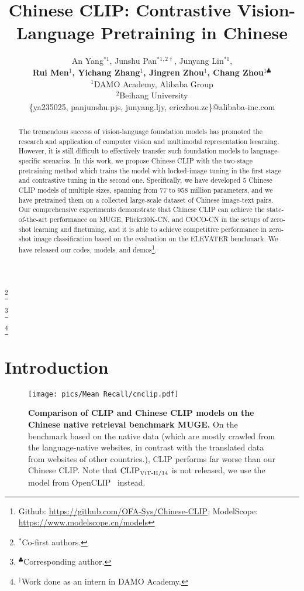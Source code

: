 \documentclass[11pt]{article}
\title{Chinese CLIP: Contrastive Vision-Language Pretraining in Chinese}
\author{An Yang$^{\ast1}$, Junshu Pan$^{\ast1,2\dagger}$, Junyang Lin$^{\ast1}$, \\
\textbf{Rui Men${^1}$, Yichang Zhang${^1}$, Jingren Zhou${^1}$, Chang Zhou$^{1\clubsuit}$ } \\
${^1}$DAMO Academy, Alibaba Group \\ 
${^2}$Beihang University \\
\{ya235025, panjunshu.pjs, junyang.ljy, ericzhou.zc\}@alibaba-inc.com
}
\begin{document}
\maketitle
\newcommand\blfootnote[1]{\begingroup
\renewcommand\thefootnote{}\footnote{#1}\addtocounter{footnote}{-1}\endgroup
}
\blfootnote{$^{\ast}$Co-first authors.}
\blfootnote{$^{\clubsuit}$Corresponding author. }
\blfootnote{$^{\dagger}$Work done as an intern in DAMO Academy.}

\begin{abstract}
The tremendous success of vision-language foundation models has promoted the research and application of computer vision and multimodal representation leearning. 
However, it is still difficult to effectively transfer such foundation models to language-specific scenarios. 
In this work, we propose Chinese CLIP with the two-stage pretraining method which trains the model with locked-image tuning in the first stage and contrastive tuning in the second one. 
Specifically, we have developed $5$ Chinese CLIP models of multiple sizes, spanning from $77$ to $958$ million parameters, and we have pretrained them on a collected large-scale dataset of Chinese image-text pairs. 
Our comprehensive experiments demonstrate that Chinese CLIP can achieve the state-of-the-art performance on MUGE, Flickr30K-CN, and COCO-CN in the setups of zero-shot learning and finetuning, and it is able to achieve competitive performance in zero-shot image classification based on the evaluation on the ELEVATER benchmark. 
We have released our codes, models, and demos\footnote{Github: \url{https://github.com/OFA-Sys/Chinese-CLIP}; ModelScope: \url{https://www.modelscope.cn/models}}. 
\end{abstract}

\section{Introduction}


\begin{figure}[t] 
    \centering
    \texttt{[image: pics/Mean Recall/cnclip.pdf]}
    \caption{\textbf{Comparison of CLIP and Chinese CLIP models on the Chinese native retrieval benchmark MUGE.} On the benchmark based on the native data (which are mostly crawled from the language-native websites, in contrast with the translated data from websites of other countries.), CLIP performs far worse than our Chinese CLIP. Note that $\text{CLIP}\rm_{ViT\text{-}H/14}$ is not released, we use the model from OpenCLIP~\citep{openclip} instead.}
    \label{fig:comparison}
\end{figure}
\end{document}
